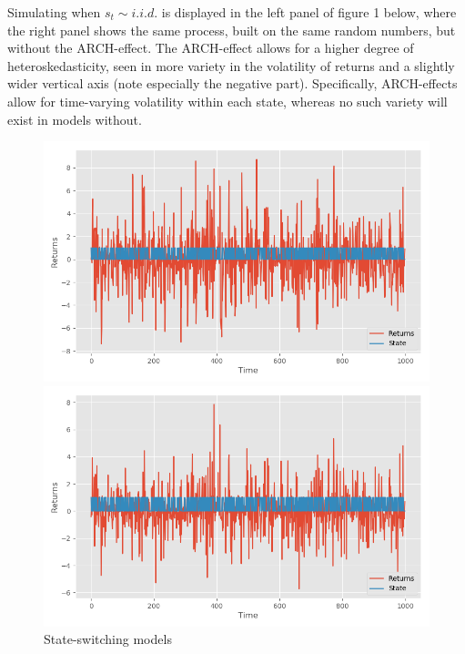 \documentclass[11pt,a4paper,oneside]{article}
\begin{document}
Simulating when $s_t \sim i.i.d.$ is displayed in the left panel of figure 1 below, where the right panel shows the same process, built on the same random numbers, but without the ARCH-effect. The ARCH-effect allows for a higher degree of heteroskedasticity, seen in more variety in the volatility of returns and a slightly wider vertical axis (note especially the negative part). Specifically, ARCH-effects allow for time-varying volatility within each state, whereas no such variety will exist in models without.
\begin{figure}[ht]
\centering
\captionsetup{justification=centering,margin=0.6cm}
\caption{State-switching models}
\begin{minipage}[b]{0.45\linewidth}
\includegraphics[scale = 0.45]{images/931a.png}
\end{minipage}
\hspace{0.5cm}
\begin{minipage}[b]{0.45\linewidth}
\centering
\includegraphics[scale = 0.45]{images/931b.png}
\end{minipage}
\begingroup
{}
\endgroup
\end{figure}
\end{document}
